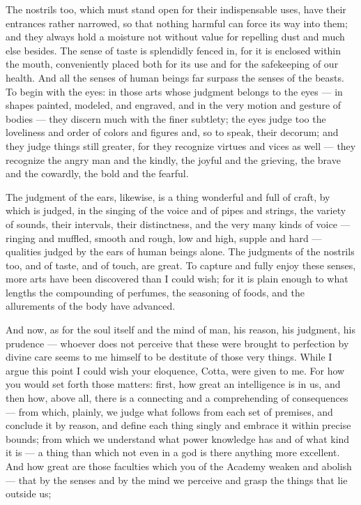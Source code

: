  The nostrils too, which must stand open for their indispensable uses, have their entrances rather narrowed, so that nothing harmful can force its way into them; and they always hold a moisture not without value for repelling dust and much else besides. The sense of taste is splendidly fenced in, for it is enclosed within the mouth, conveniently placed both for its use and for the safekeeping of our health. And all the senses of human beings far surpass the senses of the beasts. To begin with the eyes: in those arts whose judgment belongs to the eyes — in shapes painted, modeled, and engraved, and in the very motion and gesture of bodies — they discern much with the finer subtlety; the eyes judge too the loveliness and order of colors and figures and, so to speak, their decorum; and they judge things still greater, for they recognize virtues and vices as well — they recognize the angry man and the kindly, the joyful and the grieving, the brave and the cowardly, the bold and the fearful.

 The judgment of the ears, likewise, is a thing wonderful and full of craft, by which is judged, in the singing of the voice and of pipes and strings, the variety of sounds, their intervals, their distinctness, and the very many kinds of voice — ringing and muffled, smooth and rough, low and high, supple and hard — qualities judged by the ears of human beings alone. The judgments of the nostrils too, and of taste, and of touch, are great. To capture and fully enjoy these senses, more arts have been discovered than I could wish; for it is plain enough to what lengths the compounding of perfumes, the seasoning of foods, and the allurements of the body have advanced.

 And now, as for the soul itself and the mind of man, his reason, his judgment, his prudence — whoever does not perceive that these were brought to perfection by divine care seems to me himself to be destitute of those very things. While I argue this point I could wish your eloquence, Cotta, were given to me. For how you would set forth those matters: first, how great an intelligence is in us, and then how, above all, there is a connecting and a comprehending of consequences — from which, plainly, we judge what follows from each set of premises, and conclude it by reason, and define each thing singly and embrace it within precise bounds; from which we understand what power knowledge has and of what kind it is — a thing than which not even in a god is there anything more excellent. And how great are those faculties which you of the Academy weaken and abolish — that by the senses and by the mind we perceive and grasp the things that lie outside us;


